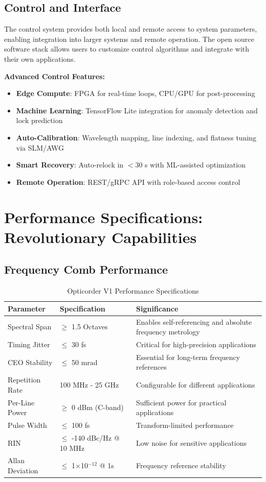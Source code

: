\documentclass[11pt,a4paper]{article}
\begin{document}
\subsection{Control and Interface}
The control system provides both local and remote access to system parameters, enabling integration into larger systems and remote operation. The open source software stack allows users to customize control algorithms and integrate with their own applications.

\textbf{Advanced Control Features:}
\begin{itemize}
\item \textbf{Edge Compute}: FPGA for real-time loops, CPU/GPU for post-processing
\item \textbf{Machine Learning}: TensorFlow Lite integration for anomaly detection and lock prediction
\item \textbf{Auto-Calibration}: Wavelength mapping, line indexing, and flatness tuning via SLM/AWG
\item \textbf{Smart Recovery}: Auto-relock in $<$30 s with ML-assisted optimization
\item \textbf{Remote Operation}: REST/gRPC API with role-based access control
\end{itemize}

\section{Performance Specifications: Revolutionary Capabilities}

\subsection{Frequency Comb Performance}
\begin{table}[ht]
\centering
\caption{Opticorder V1 Performance Specifications}
\begin{tabular}{@{}lll@{}}
\toprule
\textbf{Parameter} & \textbf{Specification} & \textbf{Significance} \\
\midrule
Spectral Span & $\geq$ 1.5 Octaves & Enables self-referencing and absolute frequency metrology \\
Timing Jitter & $\leq$ 30 fs & Critical for high-precision applications \\
CEO Stability & $\leq$ 50 mrad & Essential for long-term frequency references \\
Repetition Rate & 100 MHz - 25 GHz & Configurable for different applications \\
Per-Line Power & $\geq$ 0 dBm (C-band) & Sufficient power for practical applications \\
Pulse Width & $\leq$ 100 fs & Transform-limited performance \\
RIN & $\leq$ -140 dBc/Hz @ 10 MHz & Low noise for sensitive applications \\
Allan Deviation & $\leq$ 1$\times$10$^{-12}$ @ 1s & Frequency reference stability \\
\bottomrule
\end{tabular}
\end{table}
\end{document}
